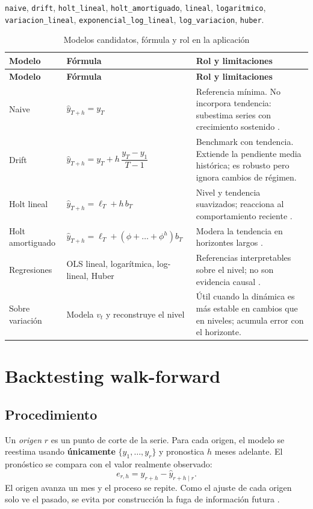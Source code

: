 \documentclass[11pt,letterpaper]{article}
\begin{document}
\begin{center}
\texttt{naive}, \texttt{drift}, \texttt{holt\_lineal}, \texttt{holt\_amortiguado},
\texttt{lineal}, \texttt{logaritmico}, \texttt{variacion\_lineal},
\texttt{exponencial\_log\_lineal}, \texttt{log\_variacion}, \texttt{huber}.
\end{center}

\begin{longtable}{@{}p{3.0cm}p{4.6cm}p{7.6cm}@{}}
\caption{Modelos candidatos, fórmula y rol en la aplicación}\\
\toprule
\textbf{Modelo} & \textbf{Fórmula} & \textbf{Rol y limitaciones} \\
\midrule
\endfirsthead
\toprule
\textbf{Modelo} & \textbf{Fórmula} & \textbf{Rol y limitaciones} \\
\midrule
\endhead
Naive & \(\hat y_{T+h}=y_T\) & Referencia mínima. No incorpora tendencia: subestima series con crecimiento sostenido \cite{hyndman2021fpp3}. \\
Drift & \(\hat y_{T+h}=y_T+h\,\dfrac{y_T-y_1}{T-1}\) & Benchmark con tendencia. Extiende la pendiente media histórica; es robusto pero ignora cambios de régimen. \\
Holt lineal & \(\hat y_{T+h}=\ell_T+h\,b_T\) & Nivel y tendencia suavizados; reacciona al comportamiento reciente \cite{holt1957}. \\
Holt amortiguado & \(\hat y_{T+h}=\ell_T+(\phi+\dots+\phi^{h})b_T\) & Modera la tendencia en horizontes largos \cite{gardner_mckenzie1985}. \\
Regresiones & OLS lineal, logarítmica, log-lineal, Huber & Referencias interpretables sobre el nivel; no son evidencia causal \cite{granger_newbold1974}. \\
Sobre variación & Modela \(v_t\) y reconstruye el nivel & Útil cuando la dinámica es más estable en cambios que en niveles; acumula error con el horizonte. \\
\bottomrule
\end{longtable}

\section{Backtesting walk-forward}

\subsection{Procedimiento}

Un \emph{origen} \(r\) es un punto de corte de la serie. Para cada origen, el
modelo se reestima usando \textbf{únicamente} \(\{y_1,\dots,y_r\}\) y pronostica
\(h\) meses adelante. El pronóstico se compara con el valor realmente observado:
\begin{equation}
e_{r,h}=y_{r+h}-\hat y_{r+h\mid r}.
\end{equation}
El origen avanza un mes y el proceso se repite. Como el ajuste de cada origen
solo ve el pasado, se evita por construcción la fuga de información
futura \cite{tashman2000}.
\end{document}
